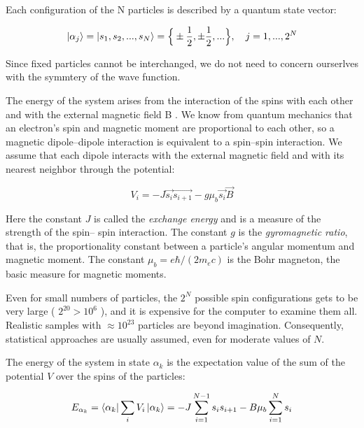 \documentclass[12pt]{article}
\theoremstyle{plain}
\begin{document}
\par Each configuration of the N particles is described by a quantum state vector:

\begin{equation*}
    \ket{\alpha_{j}} = \ket{s_1, s_2, ..., s_N} = \Big\{ \pm \frac{1}{2}, \pm \frac{1}{2}, ...\Big\}, \quad j = 1, ..., 2^{N}
\end{equation*}

\par Since fixed particles cannot be interchanged, we do not need to concern
ourserlves with the symmtery of the wave function.

\par The energy of the system arises from the interaction of the spins with each other and
with the external magnetic field B . We know from quantum mechanics that an electron’s spin
and magnetic moment are proportional to each other, so a magnetic dipole–dipole interaction
is equivalent to a spin–spin interaction. We assume that each dipole interacts with the external
magnetic field and with its nearest neighbor through the potential:

\begin{equation*}
    V_{i} = -J\vec{s_{i}}\vec{s_{i+1}} - g\mu_{b}\vec{s_i}\vec{B}
\end{equation*}

\par Here the constant $J$ is called the \textit{exchange energy} and is a measure of the strength of the spin–
spin interaction. The constant $g$ is the \textit{gyromagnetic ratio}, that is, the proportionality constant
between a particle’s angular momentum and magnetic moment. The constant $\mu_b = e\hbar / (2m_e c)$
is the Bohr magneton, the basic measure for magnetic moments.

\par Even for small numbers of particles, the $2^N$ possible spin configurations gets to be very
large ( $2^{20} > 10^6$ ), and it is expensive for the computer to examine them all. Realistic samples
with $\approx 10^{23}$ particles are beyond imagination. Consequently, statistical approaches are usually
assumed, even for moderate values of $N$.

\par The energy of the system in state $\alpha_k$ is the expectation value of the sum of the potential $V$
over the spins of the particles:

\begin{equation*}
    E_{\alpha_k} = \bra{\alpha_k}\sum_{i}V_i\ket{\alpha_k} = -J\sum_{i=1}^{N-1}s_i s_{i+1} - B\mu_{b}\sum_{i=1}^{N}s_i
\end{equation*}
\end{document}
